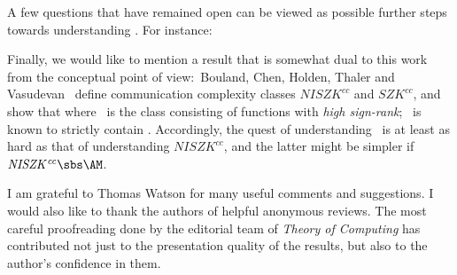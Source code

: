 A few questions that have remained open can be viewed as possible further steps towards understanding \AM.
For instance:

Finally, we would like to mention a result that is somewhat dual to this work from the conceptual point of view:\ Bouland, Chen, Holden, Thaler and Vasudevan~\cite{BCHTV17_On} define communication complexity classes $\mathit{NISZK^{cc}}$ and $\mathit{SZK^{cc}}$, and show that
where \UPP\ is the class consisting of functions with \emph{high sign-rank}; \UPP\ is known to strictly contain \PP.
Accordingly, the quest of understanding \AM\ is at least as hard as that of understanding $\mathit{NISZK^{cc}}$, and the latter might be simpler if $\mathit{NISZK^{cc}}\sbs\AM$. 


I am %
%
grateful to Thomas Watson for many useful comments and suggestions.
I would also like to thank the authors of helpful anonymous reviews.
The most careful proofreading done by the editorial
%
team of  %
\emph{Theory of Computing}   %
has contributed not just to the presentation quality
of the results, but also to the author's confidence in them.

%

